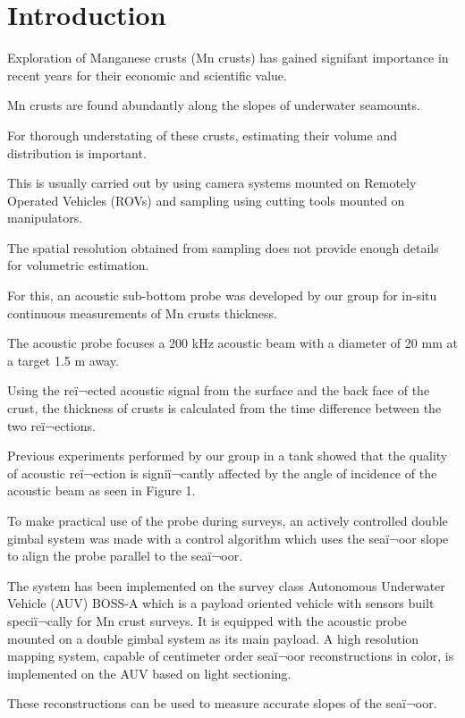 \section{Introduction}
\label{sec:intro}

Exploration of Manganese crusts (Mn crusts) has gained signifant importance in recent years for their economic and scientific value. 

Mn crusts are found abundantly along the slopes of underwater seamounts. 

For thorough understating of these crusts, estimating their volume and distribution is important.

This  is usually carried out by using camera systems mounted on Remotely Operated Vehicles (ROVs) and sampling using cutting tools mounted on manipulators. 

The spatial resolution obtained from sampling does not provide enough details for volumetric estimation. 

For this, an acoustic sub-bottom probe was developed by our group for in-situ continuous measurements of Mn crusts thickness. 

The acoustic probe focuses a 200 kHz acoustic beam with a diameter of 20 mm at a target 1.5 m away. 

Using the reï¬ected acoustic signal from the surface and the back face of the crust, the thickness of crusts is calculated from the time difference between the two reï¬ections. 

Previous experiments performed by our group in a tank showed that the quality of acoustic reï¬ection is signiï¬cantly affected by the angle of incidence of the acoustic beam as seen in Figure 1. 

To make practical use of the probe during surveys, an actively controlled double gimbal system was made with a control algorithm which uses the seaï¬oor slope to align the probe parallel to the seaï¬oor. 

The system has been implemented on the survey class Autonomous Underwater Vehicle (AUV) BOSS-A which is a payload oriented vehicle with sensors built speciï¬cally for Mn crust surveys. 
It is equipped with the acoustic probe mounted on a double gimbal system as its main payload. 
A high resolution mapping system, capable of centimeter order seaï¬oor reconstructions in color, is implemented on the AUV based on light sectioning. 

These reconstructions can be used to measure accurate slopes of the seaï¬oor. 

